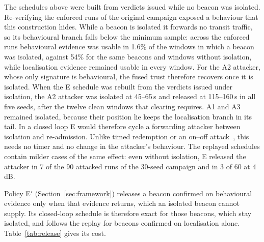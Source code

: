 \documentclass[pdflatex,sn-mathphys-num]{sn-jnl}%
\theoremstyle{thmstyleone}%
\theoremstyle{thmstyletwo}%
\theoremstyle{thmstylethree}%
\begin{document}
The schedules above were built from verdicts issued while no beacon was
isolated. Re-verifying the enforced runs of the original campaign exposed a
behaviour that this construction hides. While a beacon is isolated it
forwards no transit traffic, so its behavioural branch falls below the
minimum sample: across the enforced runs behavioural evidence was usable in
1.6\% of the windows in which a beacon was isolated, against 54\% for the same
beacons and windows without isolation, while localisation evidence remained
usable in every window. For the A2 attacker, whose only signature is
behavioural, the fused trust therefore recovers once it is isolated. When the
E schedule was rebuilt from the verdicts issued under isolation, the A2
attacker was isolated at 45--65\,s and released at 115--160\,s in all five
seeds, after the twelve clean windows that clearing requires. A1 and A3
remained isolated, because their position lie keeps the localisation branch
in its tail. In a closed loop E would therefore cycle a forwarding attacker
between isolation and re-admission. Unlike timed redemption or an on--off
attack~\cite{bansal2003ocean,sun2006attacks}, this needs no timer and no
change in the attacker's behaviour. The replayed schedules contain milder
cases of the same effect: even without isolation, E released the attacker in
7 of the 90 attacked runs of the 30-seed campaign and in 3 of 60 at 4\,dB.

Policy E$'$ (Section~\ref{sec:framework}) releases a beacon confirmed on
behavioural evidence only when that evidence returns, which an isolated
beacon cannot supply. Its closed-loop schedule is therefore exact for those
beacons, which stay isolated, and follows the replay for beacons confirmed on
localisation alone. Table~\ref{tab:release} gives its cost.
\end{document}
